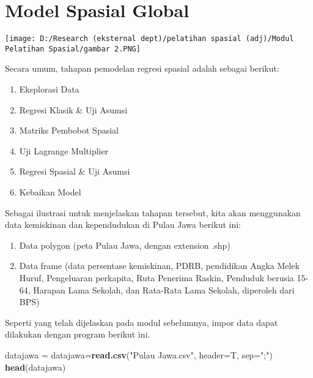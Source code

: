 \documentclass[
]{book}
\newenvironment{Shaded}{\begin{snugshade}}{\end{snugshade}}
\newcommand{\DataTypeTok}[1]{\textcolor[rgb]{0.13,0.29,0.53}{#1}}
\newcommand{\KeywordTok}[1]{\textcolor[rgb]{0.13,0.29,0.53}{\textbf{#1}}}
\newcommand{\NormalTok}[1]{#1}
\newcommand{\StringTok}[1]{\textcolor[rgb]{0.31,0.60,0.02}{#1}}
\begin{document}
\hypertarget{model-spasial-global}{%
\section{Model Spasial Global}\label{model-spasial-global}}

\texttt{[image: D:/Research (eksternal dept)/pelatihan spasial (adj)/Modul Pelatihan Spasial/gambar 2.PNG]}

Secara umum, tahapan pemodelan regresi spasial adalah sebagai berikut:

\begin{enumerate}
\def\labelenumi{(\arabic{enumi})}
\item
  Eksplorasi Data
\item
  Regresi Klasik \& Uji Asumsi
\item
  Matriks Pembobot Spasial
\item
  Uji Lagrange Multiplier
\item
  Regresi Spasial \& Uji Asumsi
\item
  Kebaikan Model
\end{enumerate}

Sebagai ilustrasi untuk menjelaskan tahapan tersebut, kita akan menggunakan data kemiskinan dan kependudukan di Pulau Jawa berikut ini:

\begin{enumerate}
\def\labelenumi{\arabic{enumi}.}
\item
  Data polygon (peta Pulau Jawa, dengan extension .shp)
\item
  Data frame (data persentase kemiskinan, PDRB, pendidikan Angka Melek Huruf, Pengeluaran perkapita, Ruta Penerima Raskin, Penduduk berusia 15-64, Harapan Lama Sekolah, dan Rata-Rata Lama Sekolah, diperoleh dari BPS)
\end{enumerate}

Seperti yang telah dijelaskan pada modul sebelumnya, impor data dapat dilakukan dengan program berikut ini.

\begin{Shaded}
\begin{Highlighting}[]
\NormalTok{datajawa =}\StringTok{ }\NormalTok{datajawa=}\KeywordTok{read.csv}\NormalTok{(}\StringTok{"Pulau Jawa.csv"}\NormalTok{, }\DataTypeTok{header=}\NormalTok{T, }\DataTypeTok{sep=}\StringTok{";"}\NormalTok{)}
\KeywordTok{head}\NormalTok{(datajawa)}
\end{Highlighting}
\end{Shaded}
\end{document}
